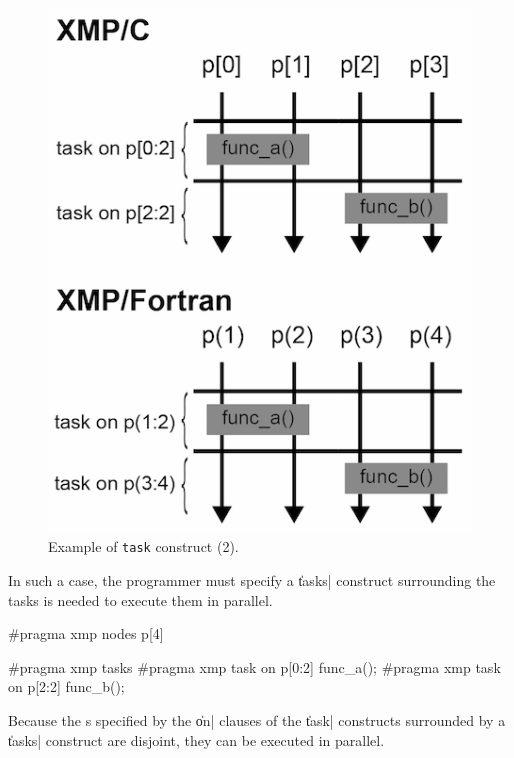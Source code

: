 \begin{figure}
  \centering
  \includegraphics[width=0.6\columnwidth]{figs/task_noparallel.png}
  \caption{Example of {\tt task} construct (2).}
\end{figure}

In such a case, the programmer must specify a \|tasks| construct
surrounding the tasks is needed to execute them in parallel.

\begin{XCexample}
#pragma xmp nodes p[4]

#pragma xmp tasks
{
#pragma xmp task on p[0:2]
{
  func_a();
}
#pragma xmp task on p[2:2]
{
  func_b();
}
}
\end{XCexample}


Because the {\nset}s specified by the \|on| clauses of the \|task|
constructs surrounded by a \|tasks| construct are disjoint, they can be
executed in parallel.

